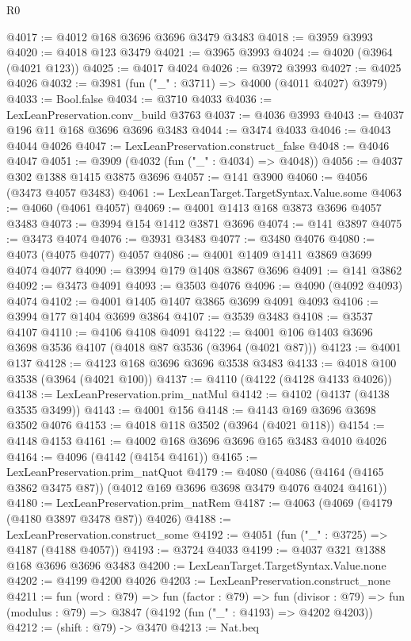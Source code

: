 \begin{lexlean}{R0}
\begin{coremodule}
@4017 := @4012 @168 @3696 @3696 @3479 @3483
@4018 := @3959 @3993
@4020 := @4018 @123 @3479
@4021 := @3965 @3993
@4024 := @4020 (@3964 (@4021 @123))
@4025 := @4017 @4024
@4026 := @3972 @3993
@4027 := @4025 @4026
@4032 := @3981 (fun ("_" : @3711) => @4000 (@4011 @4027) @3979)
@4033 := Bool.false
@4034 := @3710 @4033
@4036 := LexLeanPreservation.conv_build @3763
@4037 := @4036 @3993
@4043 := @4037 @196 @11 @168 @3696 @3696 @3483
@4044 := @3474 @4033
@4046 := @4043 @4044 @4026
@4047 := LexLeanPreservation.construct_false
@4048 := @4046 @4047
@4051 := @3909 (@4032 (fun ("_" : @4034) => @4048))
@4056 := @4037 @302 @1388 @1415 @3875 @3696
@4057 := @141 @3900
@4060 := @4056 (@3473 @4057 @3483)
@4061 := LexLeanTarget.TargetSyntax.Value.some
@4063 := @4060 (@4061 @4057)
@4069 := @4001 @1413 @168 @3873 @3696 @4057 @3483
@4073 := @3994 @154 @1412 @3871 @3696
@4074 := @141 @3897
@4075 := @3473 @4074
@4076 := @3931 @3483
@4077 := @3480 @4076
@4080 := @4073 (@4075 @4077) @4057
@4086 := @4001 @1409 @1411 @3869 @3699 @4074 @4077
@4090 := @3994 @179 @1408 @3867 @3696
@4091 := @141 @3862
@4092 := @3473 @4091
@4093 := @3503 @4076
@4096 := @4090 (@4092 @4093) @4074
@4102 := @4001 @1405 @1407 @3865 @3699 @4091 @4093
@4106 := @3994 @177 @1404 @3699 @3864
@4107 := @3539 @3483
@4108 := @3537 @4107
@4110 := @4106 @4108 @4091
@4122 := @4001 @106 @1403 @3696 @3698 @3536 @4107 (@4018 @87 @3536 (@3964 (@4021 @87)))
@4123 := @4001 @137
@4128 := @4123 @168 @3696 @3696 @3538 @3483
@4133 := @4018 @100 @3538 (@3964 (@4021 @100))
@4137 := @4110 (@4122 (@4128 @4133 @4026))
@4138 := LexLeanPreservation.prim_natMul
@4142 := @4102 (@4137 (@4138 @3535 @3499))
@4143 := @4001 @156
@4148 := @4143 @169 @3696 @3698 @3502 @4076
@4153 := @4018 @118 @3502 (@3964 (@4021 @118))
@4154 := @4148 @4153
@4161 := @4002 @168 @3696 @3696 @165 @3483 @4010 @4026
@4164 := @4096 (@4142 (@4154 @4161))
@4165 := LexLeanPreservation.prim_natQuot
@4179 := @4080
    (@4086 (@4164 (@4165 @3862 @3475 @87)) (@4012 @169 @3696 @3698 @3479 @4076 @4024 @4161))
@4180 := LexLeanPreservation.prim_natRem
@4187 := @4063 (@4069 (@4179 (@4180 @3897 @3478 @87)) @4026)
@4188 := LexLeanPreservation.construct_some
@4192 := @4051 (fun ("_" : @3725) => @4187 (@4188 @4057))
@4193 := @3724 @4033
@4199 := @4037 @321 @1388 @168 @3696 @3696 @3483
@4200 := LexLeanTarget.TargetSyntax.Value.none
@4202 := @4199 @4200 @4026
@4203 := LexLeanPreservation.construct_none
@4211 := fun (word : @79) =>
  fun (factor : @79) =>
  fun (divisor : @79) => fun (modulus : @79) => @3847 (@4192 (fun ("_" : @4193) => @4202 @4203))
@4212 := (shift : @79) -> @3470
@4213 := Nat.beq

\end{coremodule}
\end{lexlean}
